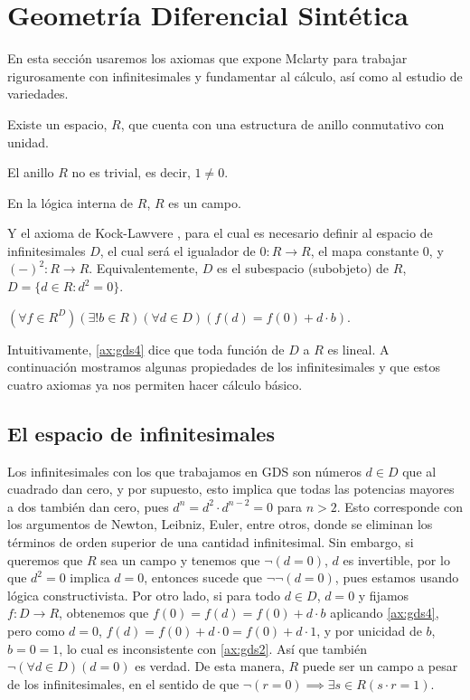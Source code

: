 \chapter{Geometría Diferencial Sintética}
\label{geodif}

En esta sección usaremos los axiomas que expone Mclarty \cite{mclarty1988defining} para trabajar
rigurosamente con infinitesimales y fundamentar al cálculo, así como al estudio de variedades.
\begin{axioma}[label=ax:gds1]
Existe un espacio, $R$, que cuenta con una estructura de anillo conmutativo con unidad.
\end{axioma}
\begin{axioma}[label=ax:gds2]
El anillo $R$ no es trivial, es decir, $1\not = 0$.
\end{axioma}
\begin{axioma}[label=ax:gds3]
En la lógica interna de $R$, $R$ es un campo.
\end{axioma}
Y el axioma de Kock-Lawvere \cite{lawvere1979categorical}, para el cual es necesario definir
al espacio de infinitesimales $D$, el cual será el igualador de $0\colon R\to R$, el mapa constante $0$, y $(-)^2\colon R\to R$.
Equivalentemente, $D$ es el subespacio (subobjeto) de $R$, $D= \{d \in R\colon d^2=0 \}$.
\begin{axioma}[label=ax:gds4]
$(\forall f \in R^D)(\exists ! b \in R)(\forall d \in D) (f(d) = f(0)+d \cdot b)$.
\end{axioma}
Intuitivamente, \ref{ax:gds4} dice que toda función de $D$ a $R$ es lineal. A continuación 
mostramos algunas propiedades de los infinitesimales y que estos cuatro axiomas ya nos 
permiten hacer cálculo básico.

\section{El espacio de infinitesimales}
Los infinitesimales con los que trabajamos en GDS son números $d\in D$ que al cuadrado dan cero, y por supuesto,
esto implica que todas las potencias mayores a dos también dan cero, pues $d^n=d^2\cdot d^{n-2}=0$ para $n>2$. Esto
corresponde con los argumentos de Newton, Leibniz, Euler, entre otros, donde se eliminan los términos de orden
superior de una cantidad infinitesimal. Sin embargo, si queremos que $R$ sea un campo y tenemos que $\lnot(d=0)$,
$d$ es invertible, por lo que $d^2=0$ implica $d=0$, entonces sucede que $\lnot\lnot(d=0)$, pues estamos usando
lógica constructivista. Por otro lado, si para todo $d\in D$, $d=0$ y fijamos $f\colon  D \to R$, obtenemos que
$f(0)=f(d)=f(0)+d \cdot b$ aplicando \ref{ax:gds4}, pero como $d=0$, $f(d)=f(0)+d \cdot 0=f(0)+d \cdot 1$, y por unicidad
de $b$, $b=0=1$, lo cual es inconsistente con \ref{ax:gds2}. Así que también $\lnot (\forall d \in D)(d=0)$ es verdad.
De esta manera, $R$ puede ser un campo a pesar de los infinitesimales, en el sentido de que $\lnot(r=0)\implies \exists s\in R(s\cdot r=1)$.

